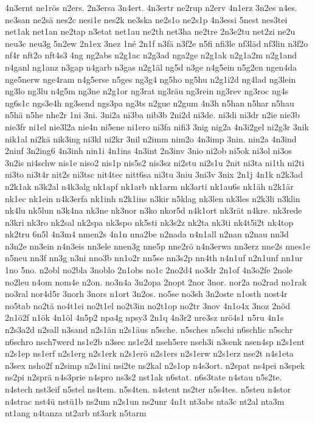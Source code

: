 {4n3ernt
ne1rös
n2ers.
2n3ersa
3n4ert.
4n3ertr
ne2rup
n2erv
4n1erz
3n2es
n4es.
ne3san
ne2sä
nes2c
nesi1e
nes2k
ne3ska
ne2s1o
ne2s1p
4n3essi
5nest
nes3tei
net1ak
net1an
ne2tap
n3etat
net1au
ne2th
net3ha
ne2tre
2n3e2tu
net2zi
ne2u
neu3c
neu3g
5n2ew
2n1ex
3nez
1né
2n1f
n3fä
n3f2e
n5fi
nfi3le
nf3läd
nf3lin
n3f2o
nf4r
nft2o
nft4s3
4ng
ng2abs
n2g1ac
n2g3ad
nga2ge
n2g1ak
n2g1a2m
n2g1and
n4ganl
ng1anz
n3gap
n4garb
n3gas
n2g1äl
ng5d
n3ge
n4g5ein
n5g2en
ngen4da
nge5nerw
nge4ram
n4g5erse
n5ges
ng3g4
ng5ho
ng5hu
n2g1i2d
ng4lad
ng3lein
ng3lo
ng3lu
n4g5m
ng3ne
n2g1or
ng3rat
ng3räu
ng3rein
ng3rev
ng3roc
ng4s
ng6s1c
ngs3e4h
ng3send
ngs3pa
ng3ts
n2gue
n2gum
4n3h
n5han
n5har
n5hau
n5hä
n5he
nhe2r
1ni
3ni.
3ni2a
ni3ba
nib3b
2ni2d
ni3de.
ni3di
ni3dr
n2ie
nie3b
nie3fr
ni1el
nie3l2a
nie4n
ni5ene
ni1ero
ni3fa
nifi3
3nig
nig2a
4n3i2gel
ni2g3r
3nik
nik1al
ni2kä
nik3ing
ni3kl
ni2kr
3nil
n2imm
nim2o
4n3imp
3nin.
nin2a
4n3ind
2ninf
3n2ing6
4n3inh
nin1i
4n1ins
4n3int
2n3inv
3nio
ni2ob
ni5ok
ni3ol
ni3os
3n2is
ni4schw
nis1e
niso2
nis1p
nis5s2
nis3sz
ni2stu
ni2s1u
2nit
ni3ta
ni1th
ni2ti
ni3to
ni3t4r
nit2s
ni3tsc
nit4tec
nitt6sa
ni3tu
3niu
3ni3v
3nix
2n1j
4n1k
n2k3ad
n2k1ak
n3k2al
n4k3alg
nk1apf
nk1arb
nk1arm
nk3arti
nk1au6s
nk1äh
n2k1är
nk1ec
nk1ein
n4k3erfa
nk1inh
n2k1ins
n3kir
n5klag
nk3len
nk3les
n2k3li
n3klin
nk4lu
nk5lun
n3k4na
nk3ne
nk3nor
n3ko
nkor5d
n4k1ort
nk3rät
n4kre.
nk3rede
n3kri
nk3ro
nk2sal
nk2spa
nk3spo
nk5sti
nk3s2z
nk2ta
nk3ti
nk4t5i2t
nk4top
nk2tru
6n5l
4n3m4
nmen2s
4n1n
nna2be
n2nada
n4n1all
n2nan
n2nau
nn3d
n3n2e
nn3ein
n4n3eis
nn3ele
nnen3g
nne5p
nne2rö
n4n3erwa
nn3erz
nne2s
nnes1e
n5neu
nn3f
nn3g
n3ni
nno3b
nn1o2r
nn5se
nn3s2p
nn4th
n4n1uf
n2n1unf
nn1ur
1no
5no.
n2obl
no2bla
3noblo
2n1obs
no1c
2no2d4
no3dr
2n1of
4n3o2fe
2nole
no2leu
n4om
nom4e
n2on.
no3n4a
3n2opa
2nopt
2nor
3nor.
nor2a
no2rad
no1rak
no3ral
nor4d5r
3norh
3nors
n1ort
3n2os.
no5se
no3sh
3n2oste
n1osth
nost4r
no5tab
no2tä
no4t1ei
no2t1el
no2t3in
no2t1op
no2tr
3nov
4n1o4x
3noz
2nöd
2n1ö2f
n1ök
4n1öl
4n5p2
npa4g
npsy3
2n1q
4n3r2
nre3sz
nrö4s1
n5ru
4n1s
n2s3a2d
n2sall
n3sand
n2s1än
n2s1äus
n5sche.
n5sches
n5schi
n6schlic
n5schr
n6schro
nsch7werd
ns1e2b
n3sec
ns1e2d
nseh5ere
nseh3i
n3senk
nsen4sp
n2s1ent
n2s1ep
ns1erf
n2s1erg
n2s1erk
n2s1erö
n2s1ers
n2s1erw
n2s1erz
nse2t
n4s1eta
n3sex
nsho2f
n2simp
n2s1ini
nsi2te
ns2kal
n2s1op
n4s3ort.
n2spat
ns4pei
n3spek
ns2pi
n2sprä
n4s3prie
n4spro
ns3s2
nst1ak
n6stat.
n6s3tate
n4stau
n5s2te.
n4stech
nst3eif
n5stel
ns4tem.
n5s4ten.
n4stent
ns2ter
n5s4tes.
n5steu
n4stor
n4strac
nst4ü
nstü1b
ns2um
n2s1un
ns2unr
4n1t
nt3abs
nta3c
nt2al
nta3m
nt1ang
n4tanza
nt2arb
nt3ark
n5tarm
}
